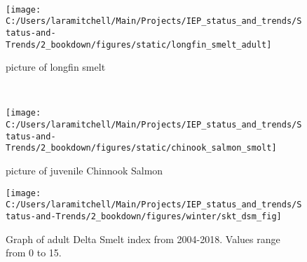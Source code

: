 \documentclass[
]{book}
\begin{document}
\begin{panel-grid}
\begin{columns-nocenter}
\begin{column40}
~

\end{column40}

\begin{column800}

\begin{figure}

{\centering \texttt{[image: C:/Users/laramitchell/Main/Projects/IEP\_status\_and\_trends/Status-and-Trends/2\_bookdown/figures/static/longfin\_smelt\_adult]} 

}

\caption{picture of longfin smelt}\label{fig:unnamed-chunk-180}
\end{figure}

\end{column800}

\begin{column40}

~

\end{column40}

\begin{column800}

\begin{figure}

{\centering \texttt{[image: C:/Users/laramitchell/Main/Projects/IEP\_status\_and\_trends/Status-and-Trends/2\_bookdown/figures/static/chinook\_salmon\_smolt]} 

}

\caption{picture of juvenile Chinnook Salmon}\label{fig:unnamed-chunk-181}
\end{figure}

\end{column800}

\end{columns-nocenter}

\begin{columns-nocenter}

\begin{column800}

\begin{expand}

\begin{figure}
\texttt{[image: C:/Users/laramitchell/Main/Projects/IEP\_status\_and\_trends/Status-and-Trends/2\_bookdown/figures/winter/skt\_dsm\_fig]} \caption{Graph of adult Delta Smelt index from 2004-2018. Values range from 0 to 15.}\label{fig:unnamed-chunk-182}
\end{figure}


\end{expand}
\end{column800}
\end{columns-nocenter}
\end{panel-grid}
\end{document}
